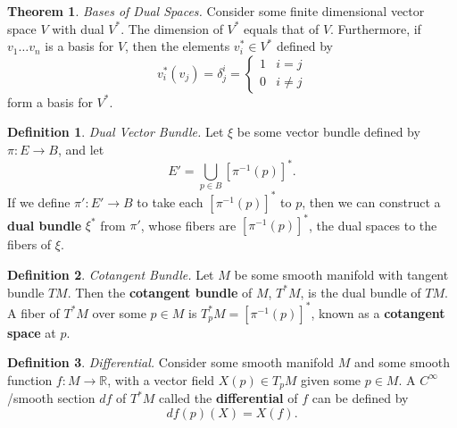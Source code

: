 \documentclass[10pt,landscape]{article}
\theoremstyle{definition}
\newtheorem{definition}{Definition}[section]
\theoremstyle{theorem}
\newtheorem{theorem}{Theorem}[section]
\theoremstyle{summary}
\theoremstyle{remark}
\newcommand{\R}{\mathbb{R}}
\newcommand{\Ci}{C^\infty}
\begin{document}
\begin{multicols*}{3}
\theoremstyle{theorem}
\begin{theorem}{\textit{Bases of Dual Spaces.}}
\label{thm_dualbases}
    Consider some finite dimensional vector space $V$ with dual $V^*$. The dimension of $V^*$ equals that of $V$. Furthermore, if $v_1\ldots v_n$ is a basis for $V$, then the elements $v_i^*\in V^*$ defined by
    \begin{equation}
        v^*_i(v_j) = \delta_j^i = 
            \begin{cases}
                1 & i = j\\
                0 & i \neq j
            \end{cases}
    \end{equation}
    form a basis for $V^*$.
\end{theorem}

\theoremstyle{definition}
\begin{definition}{\textit{Dual Vector Bundle.}}
    \label{def_dualbundle}
    Let $\xi$ be some vector bundle defined by $\pi: E\rightarrow B$, and let
    \begin{equation}
        E'=\bigcup\limits_{p\in B}\left[\pi^{-1}(p)\right]^*.
    \end{equation}
    If we define $\pi':E'\rightarrow B$ to take each $\left[\pi^{-1}(p)\right]^*$ to $p$, then we can construct a \textbf{dual bundle} $\xi^*$ from $\pi'$, whose fibers are $\left[\pi^{-1}(p)\right]^*$, the dual spaces to the fibers of $\xi$.
\end{definition}

\theoremstyle{definition}
\begin{definition}{\textit{Cotangent Bundle.}}
    \label{def_cotangentbundle}
    Let $M$ be some smooth manifold with tangent bundle $TM$. Then the \textbf{cotangent bundle} of $M$, $T^*M$, is the dual bundle of $TM$. A fiber of $T^*M$ over some $p\in M$ is $T_p^*M = \left[\pi^{-1}(p)\right]^*$, known as a \textbf{cotangent space} at $p$.
\end{definition}

\theoremstyle{definition}
\begin{definition}{\textit{Differential.}}
\label{def_differential}
    Consider some smooth manifold $M$ and some smooth function $f:M\rightarrow \R$, with a vector field $X(p)\in T_pM$ given some $p\in M$. A $\Ci$/smooth section $df$ of $T^*M$ called the \textbf{differential} of $f$ can be defined by
    \begin{equation}
        df(p)(X) = X(f).
    \end{equation}
\end{definition}


\end{multicols*}
\end{document}
